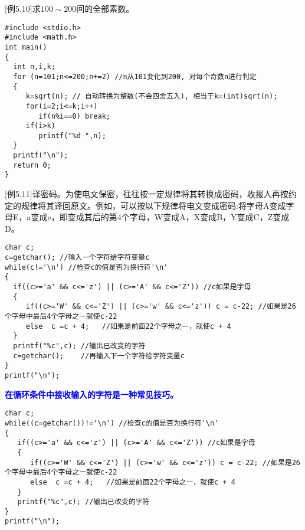 \begin{frame}
\small
$[$例5.10$]$求$100\sim 200$间的全部素数。
\pause
\begin{lstlisting}
#include <stdio.h>
#include <math.h>
int main()
{
  int n,i,k;
  for (n=101;n<=200;n+=2) //n从101变化到200, 对每个奇数n进行判定
  {
     k=sqrt(n); // 自动转换为整数(不会四舍五入), 相当于k=(int)sqrt(n);
     for(i=2;i<=k;i++)
        if(n%i==0) break;
     if(i>k) 
        printf("%d ",n);
  }
  printf("\n");
  return 0;
}
\end{lstlisting}
\end{frame}

\begin{frame}
\small
$[$例5.11$]$译密码。为使电文保密，往往按一定规律将其转换成密码，收报人再按约定的规律将其译回原文。例如，可以按以下规律将电文变成密码:将字母A变成字母E，a变成e，即变成其后的第4个字母，W变成A，X变成B，Y变成C，Z变成D。
\pause
\begin{lstlisting}
char c;
c=getchar(); //输入一个字符给字符变量c
while(c!='\n') //检查c的值是否为换行符'\n'  
{
  if((c>='a' && c<='z') || (c>='A' && c<='Z')) //c如果是字母
  {
     if((c>='W' && c<='Z') || (c>='w' && c<='z')) c = c-22; //如果是26个字母中最后4个字母之一就使c-22
     else  c =c + 4;   //如果是前面22个字母之一，就使c + 4
  }
  printf("%c",c); //输出已改变的字符
  c=getchar();    //再输入下一个字符给字符变量c
}
printf("\n");
\end{lstlisting}
\end{frame}

\begin{frame}
\textbf{\textcolor{blue}{在循环条件中接收输入的字符是一种常见技巧。}}
\begin{lstlisting}
char c;
while((c=getchar())!='\n') //检查c的值是否为换行符'\n'  
{
   if((c>='a' && c<='z') || (c>='A' && c<='Z')) //c如果是字母
   {
      if((c>='W' && c<='Z') || (c>='w' && c<='z')) c = c-22; //如果是26个字母中最后4个字母之一就使c-22
      else  c =c + 4;   //如果是前面22个字母之一，就使c + 4
   }
   printf("%c",c); //输出已改变的字符
}
printf("\n");
\end{lstlisting}
\end{frame}
